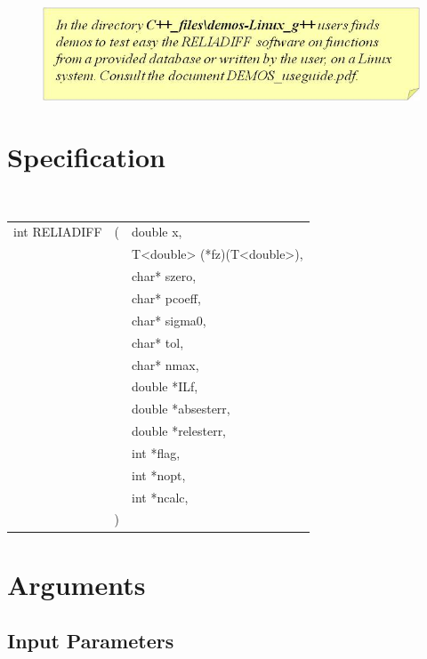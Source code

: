 \documentclass[10pt]{article}
\begin{document}
\begin{figure}[!h]
\begin{flushright}

\includegraphics[scale=0.8]{rel5}
\end{flushright}
\end{figure}


\section{Specification}

\begin{center}
{\tt
\begin{tabular}{lll}
int RELIADIFF &(	&double x,         \\
		&&T<double> (*fz)(T<double>),\\
		&&char* szero,\\
		&&char* pcoeff,	\\
		&&char* sigma0, 	\\
		&&char* tol, 	\\
		&&char* nmax, 	\\
		&&double *ILf,	\\
		&&double *absesterr,\\
		&&double *relesterr, \\
		&&int *flag, 		\\
		&&int *nopt, 		\\
		&&int *ncalc, 		\\
	       &)&
\end{tabular}
}
\end{center}


\section{Arguments}

\subsection{Input Parameters}
\end{document}
